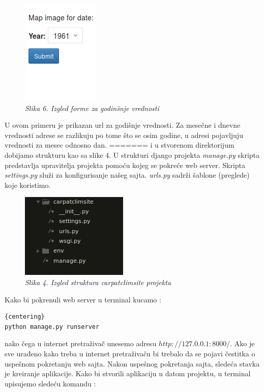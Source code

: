 \documentclass[12pt]{article}
\begin{document}
\begin{figure}[h!]
	\centering
	\includegraphics[width=0.25\linewidth]{Yearly.png}
	\caption*{\textsl{Slika 6. Izgled forme za godinšnje vrednosti}}
\end{figure}
U ovom primeru je prikazan url za godišnje vrednosti. Za mesečne i dnevne vrednosti adrese se razlikuju po tome što se osim godine, u adresi pojavljuju vrednosti za mesec odnosno dan.
=======
i u stvorenom direktorijum dobijamo strukturu kao sa slike 4. U strukturi django projekta \textsl{manage.py} skripta predstavlja upravitelja projekta pomoću kojeg se pokreće web server. Skripta        \textsl{settings.py} služi za konfigurisanje našeg sajta. \textsl{urls.py} sadrži šablone (preglede) koje koristimo.
\begin{figure}[h!]
\centering
\includegraphics[width=0.5\linewidth]{kostur.png}
\caption*{\textsl{Slika 4. Izgled struktura carpatclimsite projekta}}
\end{figure}
Kako bi pokrenuli web server u terminal kucamo : 
\begin{lstlisting}{centering}
python manage.py runserver
\end{lstlisting}nako čega u internet pretraživač unesemo adresu $http://127.0.0.1:8000/$.  Ako je sve urađeno kako treba u internet pretraživaču bi trebalo da se pojavi čestitka o uspešnom pokretanju web sajta.
Nakon uspešnog pokretanja sajta, sledeća stavka je kreiranje aplikacije. Kako bi stvorili aplikaciju u datom projektu, u terminal upisujemo sledeću komandu :
\end{document}
